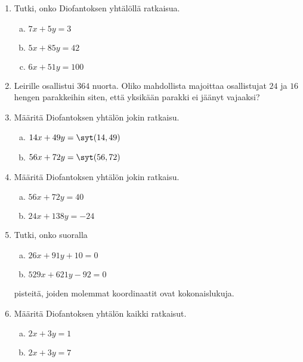 


\Harjoitustehtavat

\begin{enumerate}

\item Tutki, onko Diofantoksen yhtälöllä ratkaisua.
\begin{enumerate}[a)]
\item $7x + 5y = 3$
\item $5x + 85y = 42$
\item $6x + 51y = 100$
\end{enumerate}

\item Leirille osallistui $364$ nuorta. Oliko mahdollista majoittaa osallistujat $24$ ja $16$ hengen parakkeihin siten, että yksikään parakki ei jäänyt vajaaksi?

\item Määritä Diofantoksen yhtälön jokin ratkaisu.
\begin{enumerate}[a)]
\item $14x + 49y = \syt(14,49)$
\item $56x + 72y = \syt(56,72)$
\end{enumerate}

\item Määritä Diofantoksen yhtälön jokin ratkaisu.
\begin{enumerate}[a)]
\item $56x + 72y = 40$
\item $24x + 138y = -24$
\end{enumerate}

\item Tutki, onko suoralla
\begin{enumerate}[a)]
\item $26x + 91y + 10 = 0$
\item $529x + 621y - 92 = 0$
\end{enumerate}
pisteitä, joiden molemmat koordinaatit ovat kokonaislukuja.

\item Määritä Diofantoksen yhtälön kaikki ratkaisut.
\begin{enumerate}[a)]
\item $2x + 3y = 1$
\item $2x + 3y = 7$
\end{enumerate}


\end{enumerate}
